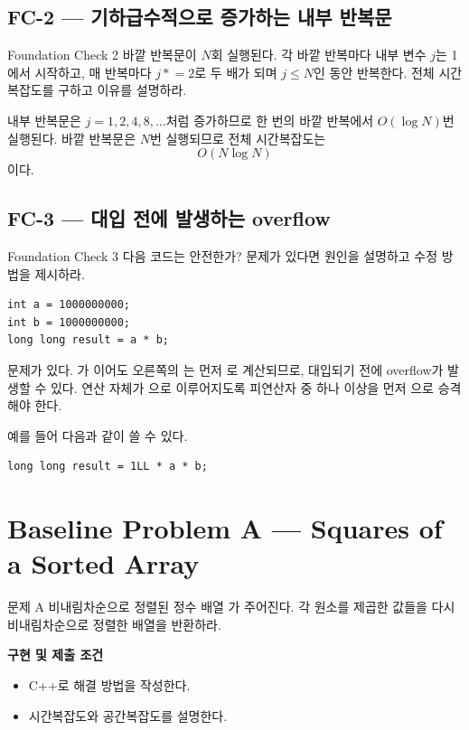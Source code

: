 \subsection{FC-2 --- 기하급수적으로 증가하는 내부 반복문}
\begin{problembox}{Foundation Check 2}
바깥 반복문이 $N$회 실행된다. 각 바깥 반복마다 내부 변수 $j$는 1에서 시작하고, 매 반복마다 $j\mathrel{*}=2$로 두 배가 되며 $j\le N$인 동안 반복한다. 전체 시간복잡도를 구하고 이유를 설명하라.
\end{problembox}

\begin{answerbox}[학습자 답안 - 기록 보존 요지]
내부 반복문은 $j=1,2,4,8,\dots$처럼 증가하므로 한 번의 바깥 반복에서 $O(\log N)$번 실행된다. 바깥 반복문은 $N$번 실행되므로 전체 시간복잡도는
\[
O(N\log N)
\]
이다.
\end{answerbox}

\subsection{FC-3 --- 대입 전에 발생하는 overflow}
\begin{problembox}{Foundation Check 3}
다음 코드는 안전한가? 문제가 있다면 원인을 설명하고 수정 방법을 제시하라.
\begin{lstlisting}
int a = 1000000000;
int b = 1000000000;
long long result = a * b;
\end{lstlisting}
\end{problembox}

\begin{answerbox}[학습자 답안 - 기록 보존 요지]
문제가 있다. 가 이어도 오른쪽의 는 먼저 로 계산되므로, 대입되기 전에 overflow가 발생할 수 있다. 연산 자체가 으로 이루어지도록 피연산자 중 하나 이상을 먼저 으로 승격해야 한다.

예를 들어 다음과 같이 쓸 수 있다.
\begin{lstlisting}
long long result = 1LL * a * b;
\end{lstlisting}
\end{answerbox}

\section{Baseline Problem A --- Squares of a Sorted Array}
\begin{problembox}{문제 A}
비내림차순으로 정렬된 정수 배열 가 주어진다. 각 원소를 제곱한 값들을 다시 비내림차순으로 정렬한 배열을 반환하라.

\textbf{구현 및 제출 조건}
\begin{itemize}
  \item C++로 해결 방법을 작성한다.
  \item 시간복잡도와 공간복잡도를 설명한다.
\end{itemize}
\end{problembox}

